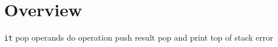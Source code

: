 \documentclass{article}
\begin{document}
\section{Overview}
\begin{algorithmic}
  \State \texttt{it}
  \State pop operands
  \State do operation
  \State push result
  \State pop and print top of stack
  \Else
  \State error
  \EndIf
  \EndWhile
\end{algorithmic}
\end{document}
